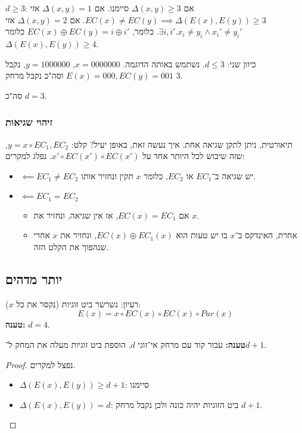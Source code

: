\documentclass[]{article}
\begin{document}
	$d \ge 3$: אם $\Delta(x, y) \ge 3$ סיימנו. אם $\Delta(x, y) = 1$ אזי $EC(x) \neq EC(y) \implies \Delta(E(x), E(y)) \ge 3$. אם $\Delta(x, y) = 2 $ אזי $\exists i, i'. x_i \neq y_i \land x_i' \neq y_i'$. כלומר, $EC(x) \oplus EC(y) = i \oplus i'$ כלומר $\Delta(E(x), E(y)) \ge 4$. 
	
	כיוון שני: $d \le 3$. נשתמש באותה הדוגמה. $x = 0000000$, $y = 1000000$, נקבל $E(x) = 000, EC(y) = 001$ וסה"כ נקבל מרחק $3$. 
	
	סה"כ $d = 3$. 
	
	\subsubsection{זיהוי שגיאות}
	תיאורטית, ניתן לתקן שגיאה אחת. איך נעשה זאת, באופן יעיל? 
	קלט: $y = x \circ EC_1, EC_2$, שזה שיבוש לכל היותר אחד על $x' \circ EC(x') \circ EC(x')$. נפלג למקרים: 
	\begin{itemize}
		\item $\impliedby EC_1 \neq EC_2 $ יש שגיאה ב־$EC_1$ או $EC_2$, כלומר $x$ תקין ונחזיר אותו. 
		\item $\impliedby EC_1 = EC_2$ 
		\begin{itemize}
			\item אם $EC(x) = EC_1$, אז אין שגיאה, ונחזיר את $x$. 
			\item אחרת, האינדקס ב־$x$ בו יש טעות הוא $EC(x) \oplus EC_1(x)$, ונחזיר את $x$ אחרי שנהפוך את הקלט הזה. 
		\end{itemize}
	\end{itemize}
	
	\subsection{יותר מדהים}
	רעיון: נשרשר ביט זוגיות (נקסר את כל $x$): 
	\[ E(x) = x \circ EC(x) \circ EC(x) \circ Par(x) \]
	\textbf{טענה: }$d = 4$. 
	
	\textbf{טענה: }עבור קוד עם מרחק אי־זוגי $d$, הוספת ביט זוגיות מעלה את המחק ל־$d + 1$. 
	
	\begin{proof}
		נפצל למקרים. 
		\begin{itemize}
			\item $\Delta(E(x), E(y)) \ge d + 1$: סיימנו
			\item $\Delta(E(x), E(y)) = d $: ביט הזוגיות יהיה כונה ולכן נקבל מרחק $d + 1$. 
		\end{itemize}
	\end{proof}
	
\end{document}
